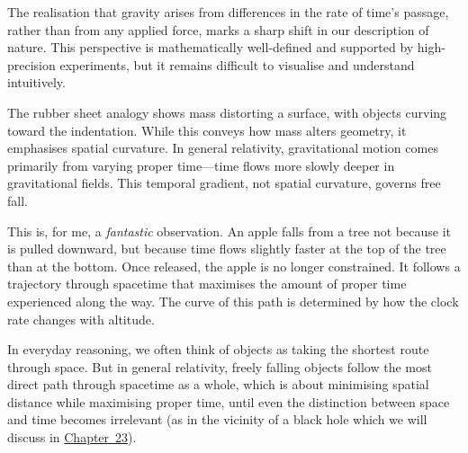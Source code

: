 \begin{commentary}

The realisation that gravity arises from differences in the rate of time’s passage, rather than from any applied force, marks a sharp shift in our description of nature. This perspective is mathematically well-defined and supported by high-precision experiments, but it remains difficult to visualise and understand intuitively.

The rubber sheet analogy shows mass distorting a surface, with objects curving toward the indentation. While this conveys how mass alters geometry, it emphasises spatial curvature. In general relativity, gravitational motion comes primarily from varying proper time—time flows more slowly deeper in gravitational fields. This temporal gradient, not spatial curvature, governs free fall.

This is, for me, a \textit{fantastic} observation. An apple falls from a tree not because it is pulled downward, but because time flows slightly faster at the top of the tree than at the bottom. Once released, the apple is no longer constrained. It follows a trajectory through spacetime that maximises the amount of proper time experienced along the way. The curve of this path is determined by how the clock rate changes with altitude.

In everyday reasoning, we often think of objects as taking the shortest route through space. But in general relativity, freely falling objects follow the most direct path through spacetime as a whole, which is about minimising spatial distance while maximising proper time, until even the distinction between space and time becomes irrelevant (as in the vicinity of a black hole which we will discuss in \hyperref[ch:blackholetimedilationredshift]{Chapter~23}).

\end{commentary}

